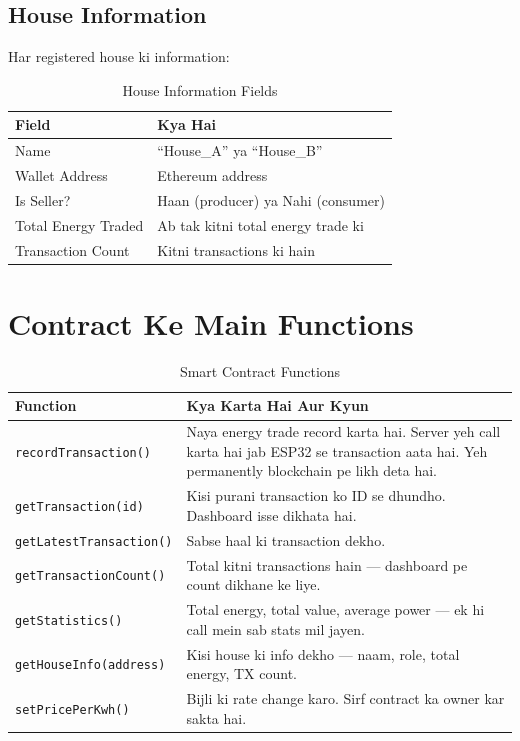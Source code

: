 \subsection{House Information}

Har registered house ki information:

\begin{table}[H]
\centering
\begin{tabularx}{\textwidth}{l X}
\toprule
\textbf{Field} & \textbf{Kya Hai} \\
\midrule
Name & ``House\_A'' ya ``House\_B'' \\
Wallet Address & Ethereum address \\
Is Seller? & Haan (producer) ya Nahi (consumer) \\
Total Energy Traded & Ab tak kitni total energy trade ki \\
Transaction Count & Kitni transactions ki hain \\
\bottomrule
\end{tabularx}
\caption{House Information Fields}
\end{table}

\section{Contract Ke Main Functions}

\begin{table}[H]
\centering
\begin{tabularx}{\textwidth}{l X}
\toprule
\textbf{Function} & \textbf{Kya Karta Hai Aur Kyun} \\
\midrule
\texttt{recordTransaction()} & Naya energy trade record karta hai. Server yeh call karta hai jab ESP32 se transaction aata hai. Yeh permanently blockchain pe likh deta hai. \\
\texttt{getTransaction(id)} & Kisi purani transaction ko ID se dhundho. Dashboard isse dikhata hai. \\
\texttt{getLatestTransaction()} & Sabse haal ki transaction dekho. \\
\texttt{getTransactionCount()} & Total kitni transactions hain --- dashboard pe count dikhane ke liye. \\
\texttt{getStatistics()} & Total energy, total value, average power --- ek hi call mein sab stats mil jayen. \\
\texttt{getHouseInfo(address)} & Kisi house ki info dekho --- naam, role, total energy, TX count. \\
\texttt{setPricePerKwh()} & Bijli ki rate change karo. Sirf contract ka owner kar sakta hai. \\
\bottomrule
\end{tabularx}
\caption{Smart Contract Functions}
\end{table}

